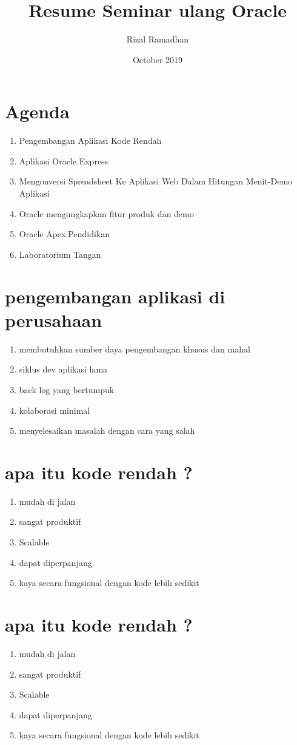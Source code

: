 \documentclass{article}
\title{Resume Seminar ulang Oracle}
\author{Rizal Ramadhan}
\date{October 2019}
\begin{document}
\maketitle

\section{Agenda}
\begin{enumerate}
\item Pengembangan Aplikasi Kode Rendah
\item  Aplikasi Oracle Express
\item Mengonversi Spreadsheet Ke Aplikasi Web Dalam Hitungan Menit-Demo
Aplikasi
\item   Oracle mengungkapkan fitur produk dan demo
\item  Oracle Apex:Pendidikan
\item Laboratorium Tangan


\end{enumerate}

\section{pengembangan aplikasi di perusahaan}
\begin{enumerate}
\item membutuhkan sumber daya pengembangan khusus dan mahal
\item siklus dev aplikasi lama
\item back log yang bertumpuk
\item   kolaborasi minimal
\item  menyelesaikan masalah dengan cara yang salah
\end{enumerate}

\section{apa itu kode rendah ?}
\begin{enumerate}
\item mudah di jalan
\item sangat produktif
\item Scalable
\item  dapat diperpanjang
\item  kaya secara fungsional dengan kode lebih sedikit
\end{enumerate}

\section{apa itu kode rendah ?}
\begin{enumerate}
\item mudah di jalan
\item sangat produktif
\item Scalable
\item  dapat diperpanjang
\item  kaya secara fungsional dengan kode lebih sedikit
\end{enumerate}
\end{document}
